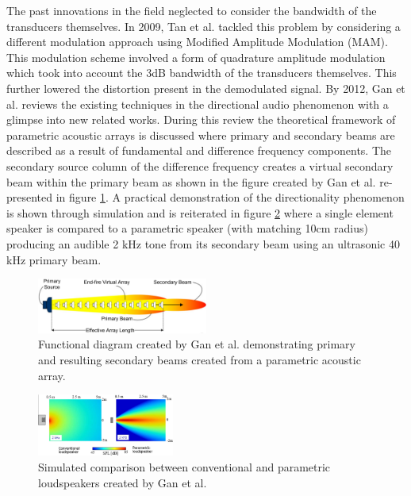 The past innovations in the field neglected to consider the bandwidth of the transducers themselves. In 2009, Tan et al. \cite{tan2010preprocessing} tackled this problem by considering a different modulation approach using Modified Amplitude Modulation (MAM). This modulation scheme involved a form of quadrature amplitude modulation which took into account the 3dB bandwidth of the transducers themselves. This further lowered the distortion present in the demodulated signal. By 2012, Gan et al. \cite{gan2012review} reviews the existing techniques in the directional audio phenomenon with a glimpse into new related works. During this review the theoretical framework of parametric acoustic arrays is discussed where primary and secondary beams are described as a result of fundamental and difference frequency components. The secondary source column of the difference frequency creates a virtual secondary beam within the primary beam as shown in the figure created by Gan et al. re-presented in figure \ref{fig:ganprisec}\cite{gan2012review}. A practical demonstration of the directionality phenomenon is shown through simulation and is reiterated in figure \ref{fig:gandirectionality}\cite{gan2012review} where a single element speaker is compared to a parametric speaker (with matching 10cm radius) producing an audible 2 kHz tone from its secondary beam using an ultrasonic 40 kHz primary beam.
\begin{figure}[ht!]
    \centering
    \includegraphics[width=0.5\textwidth]{Figures/primsecbeamarrayGan2012review.png}
    \setlength{\belowcaptionskip}{-15pt}
    \caption{Functional diagram created by Gan et al. demonstrating primary and resulting secondary beams created from a parametric acoustic array.}
    \label{fig:ganprisec}
\end{figure}
\begin{figure}[ht!]
    \centering
    \includegraphics[width=0.4\textwidth]{Figures/2khzDirectionalitygan2012review.png}
    \setlength{\belowcaptionskip}{-15pt}
    \caption{Simulated comparison between conventional and parametric loudspeakers created by Gan et al.}
    \label{fig:gandirectionality}
\end{figure}

